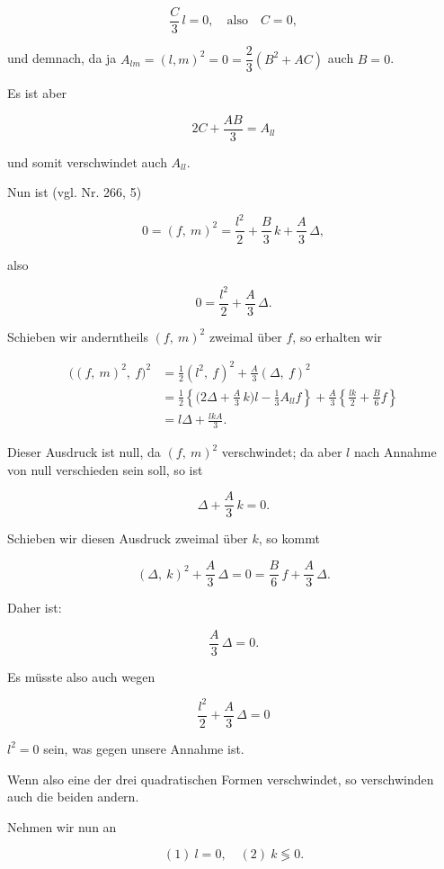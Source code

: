 \documentclass[11pt]{article}
\providecommand{\weberpage}[1]{}
\begin{document}
\[ \frac{C}{3}\, l = 0,\quad \text{also}\quad C=0, \]

und demnach, da ja $A_{lm}=(l,m)^2=0=\dfrac{2}{3}(B^2+AC)$ auch $B=0$.


\weberpage{316}

Es ist aber

\[ 2C + \frac{AB}{3} = A_{ll} \]

und somit verschwindet auch $A_{ll}$.

Nun ist (vgl. Nr. 266, 5)

\[ 0 = (f,\ m)^2 = \frac{l^2}{2} + \frac{B}{3}\, k + \frac{A}{3}\, \varDelta, \]

also

\[ 0 = \frac{l^2}{2} + \frac{A}{3}\, \varDelta. \]

Schieben wir anderntheils $(f,\ m)^2$ zweimal über $f$, so erhalten wir %

\begin{align*}
\big((f,\ m)^2,\ f\big)^2 &= \frac{1}{2}(l^2,\ f)^2 + \frac{A}{3}(\varDelta,\ f)^2\\
&= \frac{1}{2}\left\{\Big(2\varDelta + \frac{A}{3}\, k\Big) l - \frac{1}{3} A_{ll} f\right\} + \frac{A}{3}\left\{\frac{lk}{2} + \frac{B}{6} f\right\}\\
&= l\varDelta + \frac{lkA}{3}.
\end{align*}

Dieser Ausdruck ist null, da $(f,\ m)^2$ verschwindet; da aber $l$ nach Annahme von null verschieden sein soll, so ist

\[ \varDelta + \frac{A}{3}\, k = 0. \]

Schieben wir diesen Ausdruck zweimal über $k$, so kommt

\[ (\varDelta,\ k)^2 + \frac{A}{3}\, \varDelta = 0 = \frac{B}{6}\, f + \frac{A}{3}\, \varDelta. \]

Daher ist:

\[ \frac{A}{3}\, \varDelta = 0. \]

Es müsste also auch wegen

\[ \frac{l^2}{2} + \frac{A}{3}\, \varDelta = 0 \]

$l^2=0$ sein, was gegen unsere Annahme ist.

Wenn also eine der drei quadratischen Formen verschwindet, so verschwinden auch die beiden andern.

Nehmen wir nun an

\[ (1)\ l=0,\quad (2)\ k \lessgtr 0. \]
\end{document}
